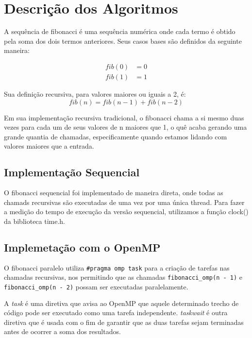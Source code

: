 \documentclass[
    12pt,
    oneside,
    a4paper,
    brazil
]{abntex2}
\begin{document}
\imprimircapa

\tableofcontents*
\cleardoublepage

\OnehalfSpacing

\chapter{Descrição dos Algoritmos}

A sequência de fibonacci é uma sequência numérica onde cada termo é obtido pela soma dos dois termos anteriores. Seus casos bases são definidos da seguinte maneira:

\[
\begin{aligned}
fib(0) &= 0 \\
fib(1) &= 1
\end{aligned}
\]

Sua definição recursiva, para valores maiores ou iguais a 2, é:
\[
fib(n) = fib(n - 1) + fib(n - 2)
\]


Em sua implementação recursiva tradicional, o fibonacci chama a si mesmo duas vezes para cada um de seus valores de n maiores que 1, o quê acaba gerando uma grande quantia de chamadas, especificamente quando estamos lidando com valores maiores que a entrada.

\section{Implementação Sequencial}

O fibonacci sequencial foi implementado de maneira direta, onde todas as chamads recursivas são executadas de uma vez por uma única thread. Para fazer a medição do tempo de execução da versão sequencial, utilizamos a função clock() da biblioteca time.h.

\section{Implemetação com o OpenMP}

O fibonacci paralelo utiliza \texttt{\#pragma omp task} para a criação de tarefas nas chamadas recursivas, nos permitindo que as chamadas \texttt{fibonacci\_omp(n - 1)} e \texttt{fibonacci\_omp(n - 2)} possam ser executadas paralelamente.

A \textit{task} é uma diretiva que avisa ao OpenMP que aquele determinado trecho de código pode ser executado como uma tarefa independente. \textit{taskwait} é outra diretiva que é usada com o fim de garantir que as duas tarefas sejam terminadas antes de ocorrer a soma dos resultados.
\end{document}
